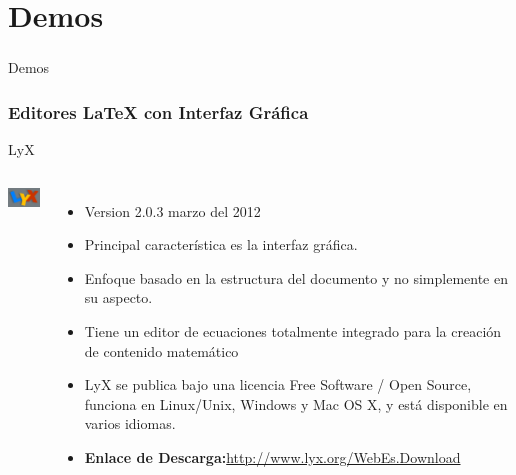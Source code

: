 \documentclass[sans serif,9pt,xcolor=dvipsnames]{beamer}%
\begin{document}
\section{Demos}
\begin{frame}
\frametitle {}
\centering \Huge Demos
\end{frame}


\begin{frame}
\frametitle {Editores \LaTeX \hspace{0.1cm}  con Interfaz Gráfica}
\begin{block}{LyX}
\begin{columns}
 \hspace{0.7cm}
\includegraphics[width=1.8cm]{imagenes/lyx.PNG} 
\begin{itemize}
\justifying
\item Version 2.0.3  marzo del 2012
\item Principal característica es la interfaz gráfica.
\item Enfoque basado en la estructura del documento y no simplemente en su aspecto.
\item Tiene un editor de ecuaciones totalmente integrado para la creación de contenido matemático
\item LyX se publica bajo una licencia Free Software / Open Source, funciona en Linux/Unix, Windows y Mac OS X, y está disponible en varios idiomas.
\item \textbf{Enlace de Descarga:}\textcolor{blue}{\url{http://www.lyx.org/WebEs.Download}}
\end{itemize}
\end{columns}
\end{block}

\end{frame}
\end{document}

